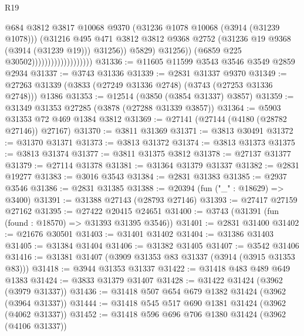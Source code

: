 \begin{lexlean}{R19}
\begin{coremodule}
                                                @684
                                                @3812
                                                @3817
                                                @10068
                                                @9370
                                                (@31236 @1078 @10068 (@3914 (@31239 @1078)))
                                                (@31216
                                                  @495
                                                  @471
                                                  @3812
                                                  @3812
                                                  @9368
                                                  @2752
                                                  (@31236 @19 @9368 (@3914 (@31239 @19)))
                                                  @31256))
                                              @5829)
                                            @31256))
                                        (@6859 @225 @30502)))))))))))))))))))
@31336 := @11605 @11599 @3543 @3546 @3549 @2859 @2934
@31337 := @3743 @31336
@31339 := @2831 @31337 @9370
@31349 := @27263 @31339 (@3833 (@27249 @31336 @2748) (@3743 (@27253 @31336 @2748))) @1386
@31353 := @12514 (@3850 (@3854 @31337) @3857)
@31359 := @31349 @31353 @27285 (@3878 (@27288 @31339 @3857))
@31364 := @5903 @31353 @72 @469 @1384 @3812
@31369 := @27141 (@27144 (@4180 (@28782 @27146)) @27167)
@31370 := @3811 @31369
@31371 := @3813 @30491
@31372 := @31370 @31371
@31373 := @3813 @31372
@31374 := @3813 @31373
@31375 := @3813 @31374
@31377 := @3811 @31375 @3812
@31378 := @27137 @31377
@31379 := @27114 @31378
@31381 := @31364 @31379 @31337
@31382 := @2831 @19277
@31383 := @3016 @3543
@31384 := @2831 @31383
@31385 := @2937 @3546
@31386 := @2831 @31385
@31388 := @20394 (fun ("_" : @18629) => @3400)
@31391 := @31388 @27143 (@28793 @27146)
@31393 := @27417 @27159 @27162
@31395 := @27422 @20415 @24651
@31400 := @3743 (@31391 (fun (found : @18570) => @31393 @31395 @3546))
@31401 := @2831 @31400
@31402 := @21676 @30501
@31403 := @31401 @31402
@31404 := @31386 @31403
@31405 := @31384 @31404
@31406 := @31382 @31405
@31407 := @3542 @31406
@31416 := @31381 @31407 (@3909 @31353 @83 @31337 (@3914 (@3915 @31353 @83)))
@31418 := @3944 @31353 @31337
@31422 := @31418 @483 @489 @649 @1383
@31424 := @3833 @31379 @31407
@31428 := @31422 @31424 (@3962 (@3979 @31337))
@31436 := @31418 @507 @654 @679 @1382 @31424 (@3962 (@3964 @31337))
@31444 := @31418 @545 @517 @690 @1381 @31424 (@3962 (@4062 @31337))
@31452 := @31418 @596 @696 @706 @1380 @31424 (@3962 (@4106 @31337))

\end{coremodule}
\end{lexlean}
